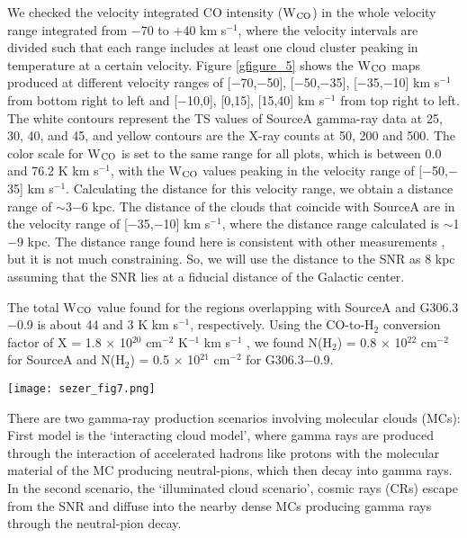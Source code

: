 \documentclass[useAMS,usenatbib]{mn2e}
\begin{document}
We checked the velocity integrated CO intensity (W$_{\rm CO}$) in the whole velocity range integrated from $-$70 to $+$40 km  s$^{-1}$, where the velocity intervals are divided such that each range includes at least one cloud cluster peaking in temperature at a certain velocity.  Figure \ref{gfigure_5} shows the W$_{\rm CO}$ maps produced at different velocity ranges of [$-$70,$-$50], [$-$50,$-$35], [$-$35,$-$10] km s$^{-1}$ from bottom right to left and [$-$10,0], [0,15], [15,40] km s$^{-1}$ from top right to left. The white contours represent the TS values of SourceA gamma-ray data at 25, 30, 40, and 45, and yellow contours are the X-ray counts at 50, 200 and 500. The color scale for W$_{\rm CO}$ is set to the same range for all plots, which is between 0.0 and 76.2 K km s$^{-1}$, with the W$_{\rm CO}$ values peaking in the velocity range of $[-$50,$-$35] km s$^{-1}$. Calculating the distance for this velocity range, we obtain a distance range of $\sim$3$-$6 kpc. The distance of the clouds that coincide with SourceA are in the velocity range of [$-$35,$-$10] km s$^{-1}$, where the distance range calculated is $\sim$1$-$9 kpc. The distance range found here is consistent with other measurements \citep{Re13,Co16}, but it is not much constraining. So, we will use the distance to the SNR as 8 kpc assuming that the SNR lies at a fiducial distance of the Galactic center.

The total W$_{\rm CO}$ value found for the regions overlapping with SourceA and G306.3$-$0.9 is about 44 and 3 K km s$^{-1}$, respectively. Using the CO-to-H$_2$ conversion factor of X = 1.8 $\times$ 10$^{20}$ cm$^{-2}$ K$^{-1}$ km s$^{-1}$ \citep{dame2001}, we found N(H$_2$) = 0.8 $\times$ 10$^{22}$ cm$^{-2}$ for SourceA and N(H$_2$) = 0.5 $\times$ 10$^{21}$ cm$^{-2}$ for G306.3$-$0.9. 

\begin{figure*}
\centering
\texttt{[image: sezer\_fig7.png]}
\caption{CO intensity maps produced at different velocity ranges of [$-$70,$-$50], [$-$50,$-$35], [$-$35,$-$10] km s$^{-1}$ for the panels from bottom right to left and [$-$10,0], [0,15], [15,40] km s$^{-1}$ from top right to left panels. The white contours represent the gamma-ray TS values of SourceA for 25, 30, 40, 45, and 49 and yellow contours are the X-ray counts at 50, 200 and 500. The color scale for the CO intensity is set between 0.0 and 76.2 K km s$^{-1}$ for all panels.}
\label{gfigure_5}
\end{figure*}

There are two gamma-ray production scenarios involving molecular clouds (MCs): First model is the `interacting cloud model'\citep{Ah94, In12}, where gamma rays are produced through the interaction of accelerated hadrons like protons with the molecular material of the MC producing neutral-pions, which then decay into gamma rays. In the second scenario, the `illuminated cloud scenario'\citep{Yam06, Ga09, Oh11}, cosmic rays (CRs) escape from the SNR and diffuse into the nearby dense MCs producing gamma rays through the neutral-pion decay. 
\end{document}
